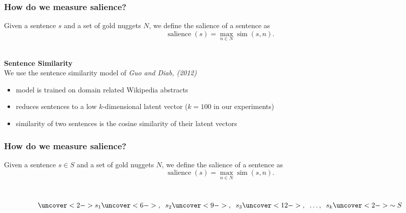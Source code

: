 \documentclass{beamer}
\begin{document}
\begin{frame}
    \frametitle{How do we measure salience?}

    Given a sentence $s$ and a set of gold nuggets $N$, we define the salience 
    of a sentence as
    $$\operatorname{salience}(s) = \max_{n \in N} \operatorname{sim}(s,n).$$

    \pause
    ~\\

    \textbf{Sentence Similarity}\\
    We use the sentence similarity model of \textit{Guo and Diab, (2012)}\\
    \begin{itemize}
        \item model is trained on domain related Wikipedia abstracts
        \item reduces sentences to a low $k$-dimensional latent vector ($k=100$
            in our experiments)
        \item similarity of two sentences is the cosine similarity of their 
            latent vectors
    \end{itemize}
\end{frame}

\begin{frame}
    \frametitle{How do we measure salience?}

    Given a sentence $s \in S$ and a set of gold nuggets $N$, we define the 
    salience of a sentence as
    $$\operatorname{salience}(s) = \max_{n \in N} \operatorname{sim}(s,n).$$

    ~\\
    $$\uncover<2->{s_1 }\uncover<6->{,\;\; s_2} 
         \uncover<9->{,\;\; s_3} 
         \uncover<12->{,\;\; \ldots,\;\; s_k}\uncover<2->{ \sim S}$$
    ~\\
    \begin{center}
    \end{center}
\end{frame}
\end{document}
